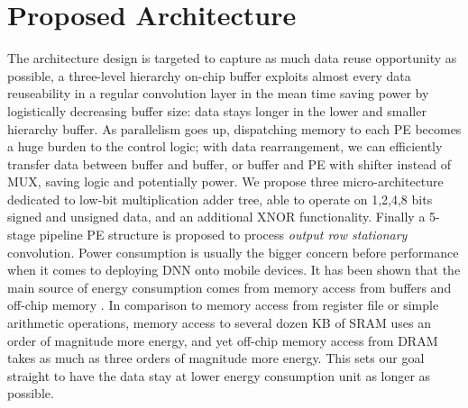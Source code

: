 \chapter{Proposed Architecture}
\label{ch:arch}
The architecture design is targeted to capture as much data reuse opportunity as possible, a three-level hierarchy on-chip buffer exploits almost every data reuseability in a regular convolution layer in the mean time saving power by logistically decreasing buffer size: data stays longer in the lower and smaller hierarchy buffer. As parallelism goes up, dispatching memory to each PE becomes a huge burden to the control logic; with data rearrangement, we can efficiently transfer data between buffer and buffer, or buffer and PE with shifter instead of MUX, saving logic and potentially power. We propose three micro-architecture dedicated to low-bit multiplication adder tree, able to operate on 1,2,4,8 bits signed and unsigned data, and an additional XNOR functionality. Finally a 5-stage pipeline PE structure is proposed to process \textit{output row stationary} convolution.
Power consumption is usually the bigger concern before performance when it comes to deploying DNN onto mobile devices. It has been shown that the main source of energy consumption comes from memory access from buffers and off-chip memory \cite{EIE}\cite{Eyeriss}. In comparison to memory access from register file or simple arithmetic operations, memory access to several dozen KB of SRAM uses an order of magnitude more energy, and yet off-chip memory access from DRAM takes as much as  three orders of magnitude more energy. This sets our goal straight to have the data stay at lower energy consumption unit as longer as possible.

